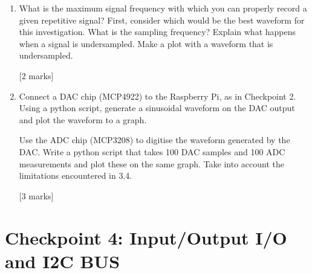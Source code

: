 \begin{enumerate}
\hfill [2 marks] \\

\item[3.4.]	What is the maximum signal frequency with which you can properly record a given repetitive signal?   First, consider which would be the best waveform for this investigation. What is the sampling frequency? Explain what happens when a signal is undersampled. Make a plot with a waveform that is undersampled.   

\hfill [2 marks] \\

\item [3.5.] Connect a DAC chip (MCP4922) to the Raspberry Pi, as in Checkpoint 2.  Using a python script, generate a sinusoidal waveform on the DAC output and plot the waveform to a graph.

Use the ADC chip (MCP3208) to digitise the waveform generated by the DAC. Write a python script that takes 100 DAC samples and 100 ADC measurements and plot these on the same graph. Take into account the limitations encountered in 3.4.                                                          
 
\hfill [3 marks] 

\end{enumerate}


\newpage
\section{Checkpoint 4: Input/Output I/O and I2C BUS}

